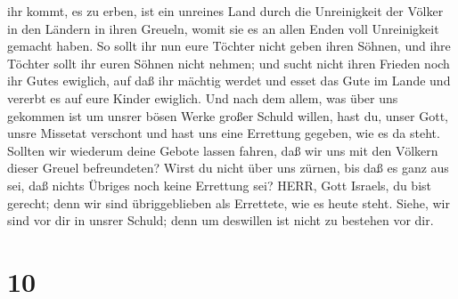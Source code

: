 ihr kommt, es zu erben, ist ein unreines Land durch die Unreinigkeit der
Völker in den Ländern in ihren Greueln, womit sie es an allen Enden voll
Unreinigkeit gemacht haben.  So sollt ihr nun eure Töchter
nicht geben ihren Söhnen, und ihre Töchter sollt ihr euren Söhnen nicht
nehmen; und sucht nicht ihren Frieden noch ihr Gutes ewiglich, auf daß
ihr mächtig werdet und esset das Gute im Lande und vererbt es auf eure
Kinder ewiglich.  Und nach dem allem, was über uns gekommen
ist um unsrer bösen Werke großer Schuld willen, hast du, unser Gott,
unsre Missetat verschont und hast uns eine Errettung gegeben, wie es da
steht.  Sollten wir wiederum deine Gebote lassen fahren,
daß wir uns mit den Völkern dieser Greuel befreundeten? Wirst du nicht
über uns zürnen, bis daß es ganz aus sei, daß nichts Übriges noch keine
Errettung sei?  HERR, Gott Israels, du bist gerecht; denn
wir sind übriggeblieben als Errettete, wie es heute steht. Siehe, wir
sind vor dir in unsrer Schuld; denn um deswillen ist nicht zu bestehen
vor dir.

\hypertarget{section-9}{%
\section{10}\label{section-9}}

